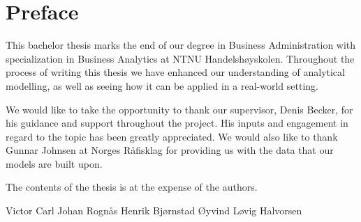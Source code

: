 \section*{Preface}

This bachelor thesis marks the end of our degree in Business Administration with specialization in Business Analytics at NTNU Handelshøyskolen. Throughout the process of writing this thesis we have enhanced our understanding of analytical modelling, as well as seeing how it can be applied in a real-world setting. 

We would like to take the opportunity to thank our supervisor, Denis Becker, for his guidance and support throughout the project. His inputs and engagement in regard to the topic has been greatly appreciated. We would also like to thank Gunnar Johnsen at Norges Råfisklag for providing us with the data that our models are built upon.    

The contents of the thesis is at the expense of the authors. 

\vspace{5cm}

\begin{Form}
    \begin{spacing}{0.8}
    \begin{center}
        \noindent\makebox[\linewidth]{\rule{0.8\textwidth}{0pt}}
        \noindent\makebox[\linewidth]{\rule{0.8\textwidth}{0.4pt}}
        Victor Carl Johan Rognås
        \noindent\makebox[\linewidth]{\rule{0.8\textwidth}{0.4pt}}
        Henrik Bjørnstad
        \noindent\makebox[\linewidth]{\rule{0.8\textwidth}{0.4pt}}
        Øyvind Løvig Halvorsen
    \end{center}
    \end{spacing}
\end{Form}